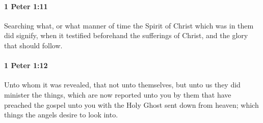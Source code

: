 		\paragraph{1 Peter 1:11} %
			\label{1PETER-1-11}

			Searching what, or what manner of time the Spirit of Christ which was in them did signify, when it testified beforehand the sufferings of Christ, and the glory that should follow.

			\begin{framed}
			\scriptsize
				\begin{compactdesc}
					\item[SBLG] \hyperref[ERAUNAO]{} 
				\end{compactdesc}
			\end{framed}

		\paragraph{1 Peter 1:12} %
			\label{1PETER-1-12}

			Unto whom it was revealed, that not unto themselves, but unto us they did minister the things, which are now reported unto you by them that have preached the gospel unto you with the Holy Ghost sent down from heaven; which things the angels desire to look into.

